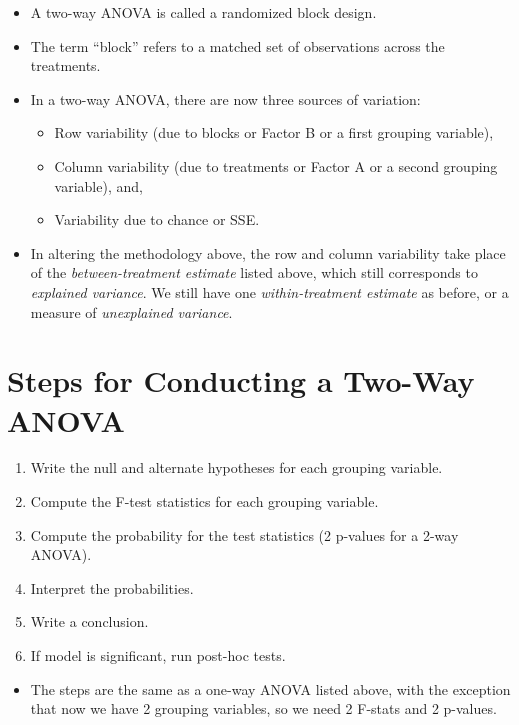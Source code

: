 \documentclass[
  letterpaper,
  DIV=11,
  numbers=noendperiod]{scrreprt}
\providecommand{\tightlist}{%
  \setlength{\itemsep}{0pt}\setlength{\parskip}{0pt}}\usepackage{longtable,booktabs,array}
\begin{document}
\begin{itemize}
\tightlist
\item
  A two-way ANOVA is called a randomized block design.
\item
  The term ``block'' refers to a matched set of observations across the
  treatments.
\item
  In a two-way ANOVA, there are now three sources of variation:

  \begin{itemize}
  \tightlist
  \item
    Row variability (due to blocks or Factor B or a first grouping
    variable),
  \item
    Column variability (due to treatments or Factor A or a second
    grouping variable), and,
  \item
    Variability due to chance or SSE.
  \end{itemize}
\item
  In altering the methodology above, the row and column variability take
  place of the \emph{between-treatment estimate} listed above, which
  still corresponds to \emph{explained variance}. We still have one
  \emph{within-treatment estimate} as before, or a measure of
  \emph{unexplained variance}.
\end{itemize}

\section{Steps for Conducting a Two-Way
ANOVA}\label{steps-for-conducting-a-two-way-anova}

\begin{enumerate}
\def\labelenumi{\arabic{enumi}.}
\tightlist
\item
  Write the null and alternate hypotheses for each grouping variable.
\item
  Compute the F-test statistics for each grouping variable.
\item
  Compute the probability for the test statistics (2 p-values for a
  2-way ANOVA).
\item
  Interpret the probabilities.
\item
  Write a conclusion.
\item
  If model is significant, run post-hoc tests.
\end{enumerate}

\begin{itemize}
\tightlist
\item
  The steps are the same as a one-way ANOVA listed above, with the
  exception that now we have 2 grouping variables, so we need 2 F-stats
  and 2 p-values.
\end{itemize}
\end{document}
